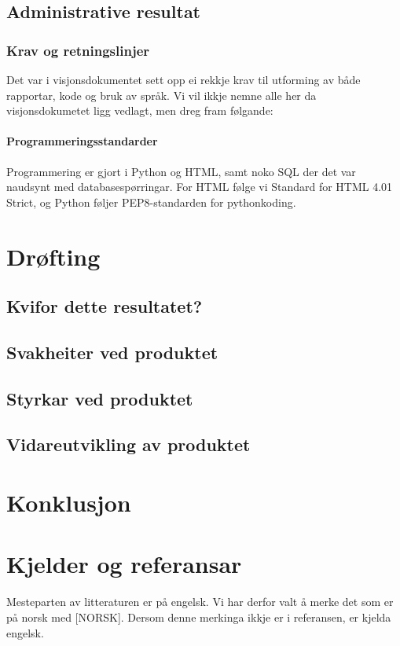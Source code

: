 \documentclass[nynorsk,12pt,a4paper,oneside]{book}
\begin{document}
\section{Administrative resultat}

\subsection{Krav og retningslinjer}
Det var i visjonsdokumentet sett opp ei rekkje krav til utforming av både rapportar, kode og bruk av språk. Vi vil ikkje nemne alle her da visjonsdokumetet ligg vedlagt, men dreg fram følgande:

\subsubsection{Programmeringsstandarder}
Programmering er gjort i Python og HTML, samt noko SQL der det var naudsynt med databasespørringar. For HTML følge vi Standard for HTML 4.01 Strict, og Python føljer PEP8-standarden for pythonkoding. 

\chapter{Drøfting}
\section{Kvifor dette resultatet?}
\section{Svakheiter ved produktet}
\section{Styrkar ved produktet}
\section{Vidareutvikling av produktet}
\chapter{Konklusjon}
\chapter{Kjelder og referansar}
Mesteparten av litteraturen er på engelsk. Vi har derfor valt å merke det som er på norsk med [NORSK]. Dersom denne merkinga ikkje er i referansen, er kjelda engelsk. 
\end{document}
